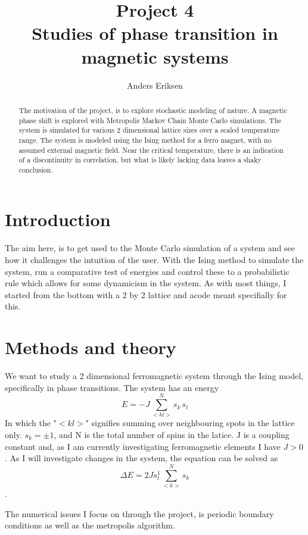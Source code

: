\documentclass[10pt, twocolumn]{revtex4-1}
\begin{document}
\title{%
    Project 4\\
    \large Studies of phase transition in magnetic systems}
\author{Anders Eriksen}
\begin{abstract}
    The motivation of the project, is to explore stochastic modeling of nature.
    A magnetic phase shift is explored with Metropolis Markov Chain Monte Carlo simulations. The system is simulated for various $2$ dimensional lattice
    sizes over a scaled temperature range. The system is modeled using the Ising method for a ferro magnet, with no assumed external magnetic field.
    Near the critical temperature, there is an indication of a discontinuity in correlation, but what is likely lacking data leaves a shaky conclusion.
\end{abstract}
\maketitle

\section{Introduction}
The aim here, is to get used to the Monte Carlo simulation of a system and see how it challenges the intuition of the user. With the Ising method to
simulate the system, run a comparative test of energies and control these to a probabilistic rule which allows for some dynamicism in the system. As
with most things, I started from the bottom with a 2 by 2 lattice and acode meant specifially for this. \cite{MortenIsingmodel}


\section{Methods and theory}

We want to study a 2 dimensional ferromagnetic system through the Ising model, specifically in phase transitions.
The system has an energy
\[ E = -J \sum_{<kl>}^N s_k \, s_l \]
In which the "$<kl>$" signifies summing over neighbouring spots in the lattice only. $s_k = \pm 1$, and N is the total number of spins in
the latice. J is a coupling constant and, as I am currently investigating ferromagnetic elements I have $J > 0$.
As I will investigate changes in the system, the equation can be solved as
\[ \Delta E = 2 Js_l^1 \sum_{<k>}^N s_k \].

The numerical issues I focus on through the project, is periodic boundary conditions as well as the metropolis algorithm. %
\end{document}
